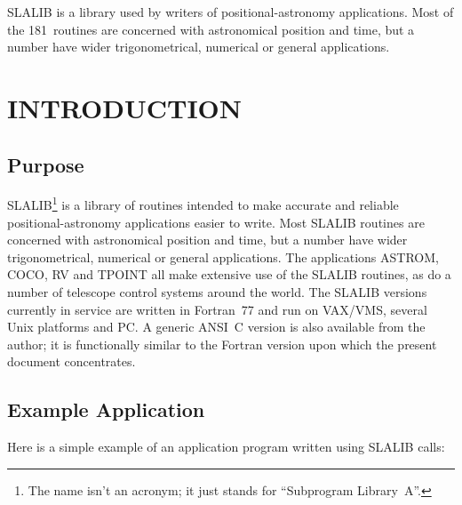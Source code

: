 \documentclass[11pt,twoside]{article}
\newcommand{\stardocinitials}  {SUN}
\newcommand{\stardocnumber}    {67.44}
\newcommand{\stardocname}{\stardocinitials /\stardocnumber}
\newenvironment{latexonly}{}{}
\newcommand{\latexonlytoc}[0]{\tableofcontents}
\newcommand{\nroutines} {181}
\renewcommand{\thepage}{\roman{page}}
\begin{document}
SLALIB is a library used by writers of positional-astronomy applications.
Most of the \nroutines\ routines are concerned with astronomical position and time,
but a number have wider trigonometrical, numerical or general applications.
 \newpage
 \begin{latexonly}
   \setlength{\parskip}{0mm}
   \latexonlytoc
   \setlength{\parskip}{\medskipamount}
   \markright{\stardocname}
 \end{latexonly}
\newpage
\renewcommand{\thepage}{\arabic{page}}
\setcounter{page}{1}

\section{INTRODUCTION}
\subsection{Purpose}
SLALIB\footnote{The name isn't an acronym;
it just stands for ``Subprogram Library~A''.}
is a library of routines
intended to make accurate and reliable positional-astronomy
applications easier to write.
Most SLALIB routines are concerned with astronomical position and time, but a
number have wider trigonometrical, numerical or general applications.
The applications ASTROM, COCO, RV and TPOINT
all make extensive use of the SLALIB
routines, as do a number of telescope control systems around the world.
The SLALIB versions currently in service are written in
Fortran~77 and run on VAX/VMS, several Unix platforms and PC.
A generic ANSI~C version is also available from the author;  it is
functionally similar to the Fortran version upon which the present
document concentrates.

\subsection{Example Application}
Here is a simple example of an application program written
using SLALIB calls:
\end{document}

